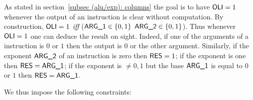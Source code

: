 As stated in section~\ref{subsec (alu/exp): columns}
the goal is to have $\textsf{OLI} = 1$ whenever the output of an instruction is clear without computation.
By construction, $\textsf{OLI} = 1$ \emph{iff} \big($\textsf{ARG}\textsf{\_1} \in \{0,1\}$ \OR $\textsf{ARG}\textsf{\_2} \in \{0,1\}$\big).
Thus whenever $\textsf{OLI} = 1$ one can deduce the result on sight.
Indeed, if one of the arguments of a  instruction is $0$ or $1$ then the output is $0$ or the other argument.
Similarly, if the exponent $\textsf{ARG}\textsf{\_2}$ of an  instruction is zero then $\textsf{RES} = 1$;
if the exponent is one then $\textsf{RES} = \textsf{ARG}\textsf{\_1}$; if the exponent is $\neq 0, 1$ but the base $\textsf{ARG}\textsf{\_1}$ is equal to $0$ or $1$ then $\textsf{RES} = \textsf{ARG}\textsf{\_1}$.
\begin{center}
\end{center}
We thus impose the following constraints:
